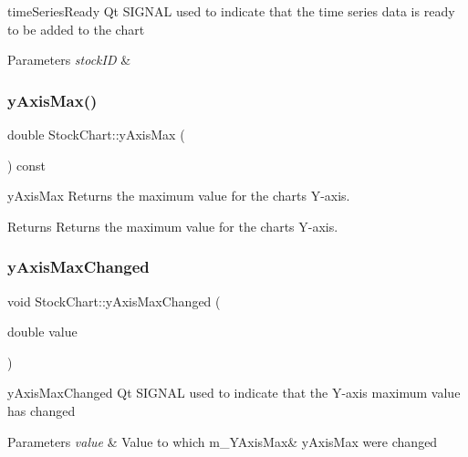 time\+Series\+Ready Qt S\+I\+G\+N\+AL used to indicate that the time series data is ready to be added to the chart 


\begin{DoxyParams}{Parameters}
{\em stock\+ID} & \\
\hline
\end{DoxyParams}
\mbox{\label{class_stock_chart_a385cf91d047bd0cad511a0e068ed239f}} 
\subsubsection{\texorpdfstring{y\+Axis\+Max()}{yAxisMax()}}
{\footnotesize\ttfamily double Stock\+Chart\+::y\+Axis\+Max (\begin{DoxyParamCaption}{ }\end{DoxyParamCaption}) const}



y\+Axis\+Max Returns the maximum value for the chart\textquotesingle{}s Y-\/axis. 

\begin{DoxyReturn}{Returns}
Returns the maximum value for the chart\textquotesingle{}s Y-\/axis. 
\end{DoxyReturn}
\mbox{\label{class_stock_chart_a336420011eff34ae4b5c1afded4873db}} 
\subsubsection{\texorpdfstring{y\+Axis\+Max\+Changed}{yAxisMaxChanged}}
{\footnotesize\ttfamily void Stock\+Chart\+::y\+Axis\+Max\+Changed (\begin{DoxyParamCaption}\item[{double}]{value }\end{DoxyParamCaption})\hspace{0.3cm}{\ttfamily [signal]}}



y\+Axis\+Max\+Changed Qt S\+I\+G\+N\+AL used to indicate that the Y-\/axis maximum value has changed 


\begin{DoxyParams}{Parameters}
{\em value} & Value to which m\+\_\+\+Y\+Axis\+Max\& y\+Axis\+Max were changed \\
\hline
\end{DoxyParams}
\mbox{\label{class_stock_chart_a5b03fca2a7985f4802623be2c86f1316}} 
